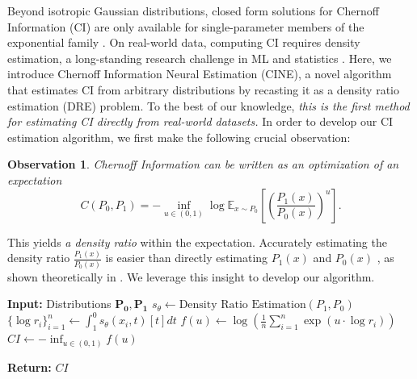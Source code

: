 \documentclass[11pt,letterpaper]{article}
\newtheorem{observation}{Observation}
\begin{document}
Beyond isotropic Gaussian distributions, closed form solutions for Chernoff Information (CI) are only available for single-parameter members of the exponential family \citep{Nielsen_2013}. On real-world data, computing CI requires density estimation, a long-standing research challenge in ML and statistics \citep{bishop2006pattern, vapnik2006estimation}. 
Here, we introduce Chernoff Information Neural Estimation (CINE), a novel algorithm that estimates CI from arbitrary distributions by 
recasting it as a density ratio estimation (DRE) problem. To the best of our knowledge, \textit{this is the first method for estimating CI directly from real-world datasets.} In order to develop our CI estimation algorithm, we first make the following crucial observation:
\begin{observation}
    Chernoff Information can be written as an optimization of an expectation 
    \begin{equation} \label{eq:expci}
    C(P_0, P_1) = -\inf_{u \in (0,1)} \log\mathbb{E}_{x\sim P_0}\left[ \left(\frac{P_1(x)}{P_0(x)} \right)^u \right].
\end{equation}

\end{observation}
 This yields \textit{a density ratio} within the expectation. Accurately estimating the density ratio $\frac{P_1(x)}{P_0(x)}$ is easier than directly estimating $P_1(x)$ and $P_0(x)$ \citep{sugiyama2012density}, as shown theoretically in \citet{kanamori2010theoretical}. We leverage this insight to develop our algorithm.




\begin{algorithm}[t]
\caption{\textbf{CINE via DRE-$\infty$ \citep{choi2022density}}} 
\label{alg:CINE} 
\begin{algorithmic}[1]
    \State \textbf{Input:} Distributions $\boldsymbol{P_0}, \boldsymbol{P_1}$
    \State $s_\theta \gets \text{Density Ratio Estimation}(P_1, P_0)$ 
    \State $\{\log r_i\}_{i=1}^n \gets \int_1^0s_\theta(x_i,t)[t]dt$ 
    \State $f(u) \gets \log\left(\frac{1}{n} \sum_{i=1}^n \exp(u \cdot \log r_i)\right)$ 
    \State $CI \gets -\inf_{u \in (0,1)} f(u)$ 
    
    \State \textbf{Return:} $CI$
\end{algorithmic}
\label{alg}
\end{algorithm}
\end{document}
